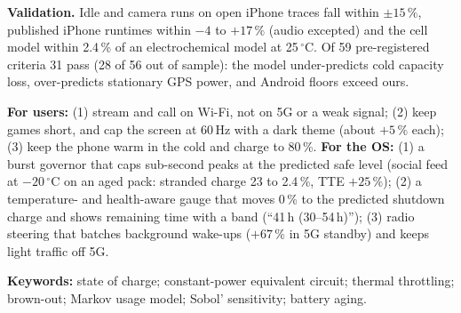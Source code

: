 \smallskip\noindent\textbf{Validation.} Idle and camera runs on open iPhone traces fall within $\pm15\,\%$, published
iPhone runtimes within $-4$ to $+17\,\%$ (audio excepted) and the cell model within 2.4\,\% of an
electrochemical model at 25\,$^\circ$C. Of 59 pre-registered criteria 31 pass (28 of 56 out of sample): the model
under-predicts cold capacity loss, over-predicts stationary GPS power, and Android floors exceed ours.

\smallskip\noindent\textbf{For users:} (1) stream and call on Wi-Fi, not on 5G or a weak signal; (2) keep games short, and
cap the screen at 60\,Hz with a dark theme (about $+5\,\%$ each); (3) keep the phone warm in the cold and charge to 80\,\%.
\textbf{For the OS:} (1) a burst governor that caps sub-second peaks at the predicted safe level (social feed at
$-20\,^\circ$C on an aged pack: stranded charge 23 to 2.4\,\%, TTE $+25\,\%$); (2) a temperature- and
health-aware gauge that moves 0\,\% to the predicted shutdown charge and shows remaining time with a band
(``41\,h (30--54\,h)''); (3) radio steering that batches background wake-ups ($+67\,\%$ in 5G standby) and keeps
light traffic off 5G.

\smallskip\noindent\textbf{Keywords:} state of charge; constant-power equivalent circuit; thermal throttling; brown-out;
Markov usage model; Sobol' sensitivity; battery aging.

